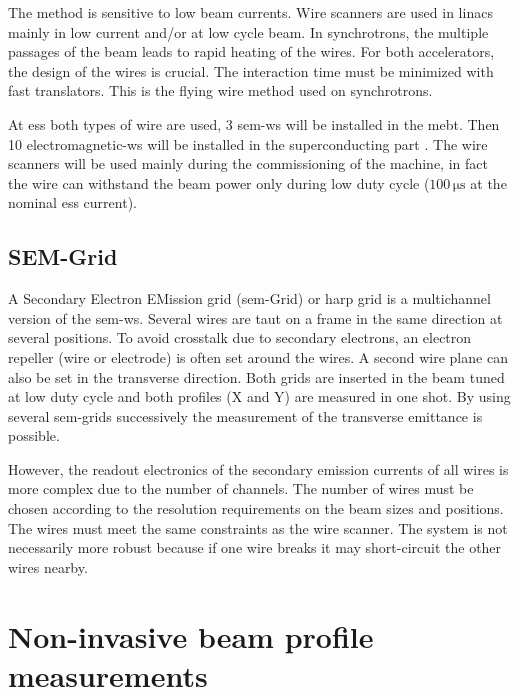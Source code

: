 \begin{refsection}
  The method is sensitive to low beam currents. Wire scanners are used in linacs mainly in low current and/or at low cycle beam. In synchrotrons, the multiple passages of the beam leads to rapid heating of the wires.
  For both accelerators, the design of the wires is crucial. The interaction time must be minimized with fast translators. This is the flying wire method used on synchrotrons.

  At \acrshort{ess} both types of wire are used, 3 \acrshort{sem}-\acrshort{ws} will be installed in the \acrshort{mebt}. Then 10 electromagnetic-\acrshort{ws} will be installed in the superconducting part \cite{Cheymol:HB2016-MOPL018}. The wire scanners will be used mainly during the commissioning of the machine, in fact the wire can withstand the beam power only during low duty cycle ($100\,\mathrm{\mu s}$ at the nominal \acrshort{ess} current).

  \subsection{SEM-Grid}
  A Secondary Electron EMission grid (\acrshort{sem}-Grid) or harp grid is a multichannel version of the \acrshort{sem}-\acrshort{ws}. Several wires are taut on a frame in the same direction at several positions. To avoid crosstalk due to secondary electrons, an electron repeller (wire or electrode) is often set around the wires. A second wire plane can also be set in the transverse direction. Both grids are inserted in the beam tuned at low duty cycle and both profiles (X and Y) are measured in one shot. By using several \acrshort{sem}-grids successively the measurement of the transverse emittance is possible.

  However, the readout electronics of the secondary emission currents of all wires is more complex due to the number of channels. The number of wires must be chosen according to the resolution requirements on the beam sizes and positions. The wires must meet the same constraints as the wire scanner. The system is not necessarily more robust because if one wire breaks it may short-circuit the other wires nearby.

  \section{Non-invasive beam profile measurements}

\end{refsection}

